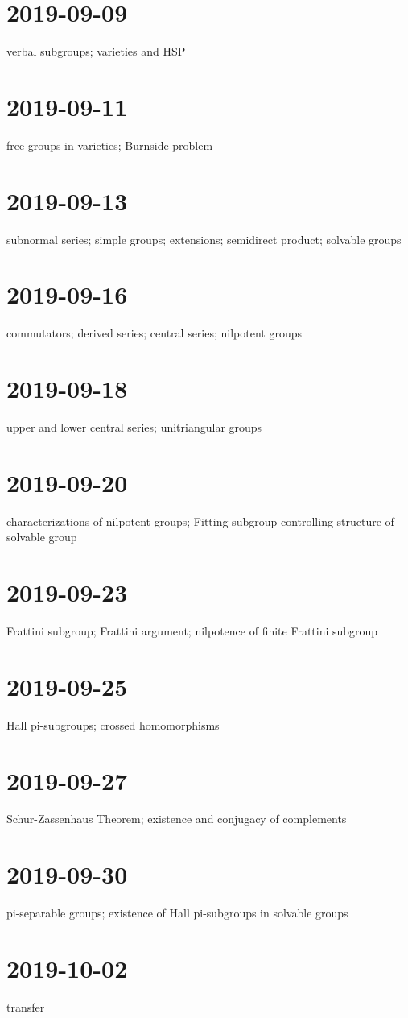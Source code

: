 \documentclass{ccg-notes}
\begin{document}
\section{2019-09-09}
verbal subgroups;
varieties and HSP

\section{2019-09-11}
free groups in varieties;
Burnside problem


\section{2019-09-13}
subnormal series;
simple groups;
extensions;
semidirect product;
solvable groups

\section{2019-09-16}
commutators;
derived series;
central series;
nilpotent groups

\section{2019-09-18}
upper and lower central series;
unitriangular groups

\section{2019-09-20}
characterizations of nilpotent groups;
Fitting subgroup controlling structure of solvable group

\section{2019-09-23}
Frattini subgroup;
Frattini argument;
nilpotence of finite Frattini subgroup

\section{2019-09-25}
Hall pi-subgroups;
crossed homomorphisms

\section{2019-09-27}
Schur-Zassenhaus Theorem;
existence and conjugacy of complements

\section{2019-09-30}
pi-separable groups;
existence of Hall pi-subgroups in solvable groups

\section{2019-10-02}
transfer 
\end{document}
